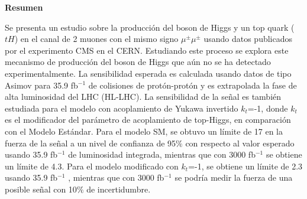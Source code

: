 
\thispagestyle{empty}
 \vspace*{2.2cm}
\begin{center}
\Large \textbf{Resumen}
\end{center} 
\vspace{1.5cm}

Se presenta un estudio sobre la producci\'on del boson de Higgs y un top quark ($tH$) en el canal de 2 muones con el mismo signo $\mu^\pm \mu^\pm$ usando datos publicados por el experimento CMS en el CERN.
Estudiando este proceso se explora este mecanismo de producci\'on del boson de Higgs que a\'un no se ha detectado experimentalmente.
La sensibilidad esperada es calculada usando  datos de tipo Asimov para 35.9 fb$^{-1}$ de colisiones de prot\'on-prot\'on y es extrapolada la fase de alta luminosidad del LHC (HL-LHC).
La sensibilidad de la se\~nal es tambi\'en estudiada para el modelo con acoplamiento de Yukawa invertido $k_t$=-1, donde $k_t$ es el modificador del par\'ametro de acoplamiento de top-Higgs, en comparaci\'on con el Modelo Est\'andar. Para el modelo SM, se obtuvo un l\'imite de 17 en la fuerza de la se\~nal a un nivel de confianza de 95$\%$ con respecto al valor esperado usando 35.9 fb$^{-1}$ de luminosidad integrada, mientras que con 3000 fb$^{-1}$ se obtiene un l\'imite de 4.3. Para el modelo modificado con $k_t$=-1, se obtiene un l\'imite de 2.3 usando 35.9 fb$^{-1}$ , mientras que con 3000 fb$^{-1}$  se podr\'ia medir la fuerza de una posible se\~nal con 10$\%$ de incertidumbre.
